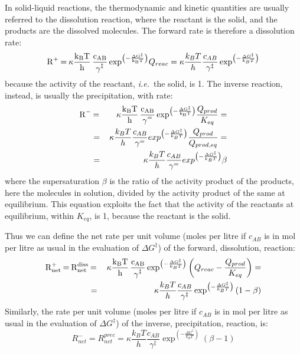 \documentclass[12pt]{paper}    %
\newcommand{\ie}{\textit{i.e.}~}
\begin{document}
In solid-liquid reactions, the thermodynamic and kinetic quantities are usually referred to the dissolution reaction, where the reactant is the solid, and the products are the dissolved molecules. The forward rate is therefore a dissolution rate:
%
\begin{equation}
\ce{R+ =  \kappa \frac{k_BT}{h} \frac{c_{AB}}{\gamma^\ddag} exp^{\left( - \frac{\Delta G^\ddag}{k_BT}\right)}} Q_{reac} = \kappa \frac{k_BT}{h} \frac{c_{AB}}{\gamma^\ddag} \exp^{\left( - \frac{\Delta G^\ddag}{k_BT}\right)} 
\end{equation}
%
because the activity of the reactant, \ie the solid, is 1. The inverse reaction, instead, is usually the precipitation, with rate:
%
\begin{eqnarray}
\ce{R- & = & \kappa \frac{k_BT}{h} \frac{c_{AB}}{\gamma^=} exp^{\left( -\frac{\Delta G^\ddag}{k_BT}\right)}} \frac{Q_{prod}}{K_{eq}}= \nonumber \\
& = & \kappa \frac{k_BT}{h} \frac{c_{AB}}{\gamma^=} exp^{\left( -\frac{\Delta G^\ddag}{k_BT}\right)} \frac{Q_{prod}}{Q_{prod,eq}} = \nonumber \\
& = & \kappa \frac{k_BT}{h} \frac{c_{AB}}{\gamma^=} exp^{\left( -\frac{\Delta G^\ddag}{k_BT}\right)} \beta 
\end{eqnarray}
%
where the supersaturation $\beta$ is the ratio of the activity product of the products, here the molecules in solution, divided by the activity product of the same at equilibrium. This equation exploits the fact that the activity of the reactants at equilibrium, within $K_{eq}$, is 1, because the reactant is the solid.

Thus we can define the net rate per unit volume  (moles per litre if $c_{AB}$ is in mol per litre as usual in the evaluation of $\Delta G^\ddag$)  of the forward, dissolution, reaction:
%
\begin{eqnarray}
\ce{R^+_{net}  =  R^{diss}_{net} & = & \kappa \frac{k_BT}{h} \frac{c_{AB}}{\gamma^\ddag} }\exp^{\left( -\frac{\Delta G^\ddag}{k_BT}\right)} \left( Q_{reac} -\frac{Q_{prod}}{K_{eq}} \right) = \nonumber \\
& = &\kappa \frac{k_BT}{h} \frac{c_{AB}}{\gamma^\ddag} \exp^{\left( -\frac{\Delta G^\ddag}{k_BT}\right)} \left( 1 -\beta\right)
\end{eqnarray}
%
Similarly, the rate per unit volume (moles per litre if $c_{AB}$ is in mol per litre as usual in the evaluation of $\Delta G^\ddag$) of the inverse, precipitation, reaction, is:
\begin{equation}
R^-_{net} =  R^{prec}_{net}  =  \kappa \frac{k_BT}{h} \frac{c_{AB}}{\gamma^\ddag} \exp^{\left( -\frac{\Delta G^\ddag}{k_BT}\right)} \left( \beta-1\right)
\end{equation}
\end{document}
